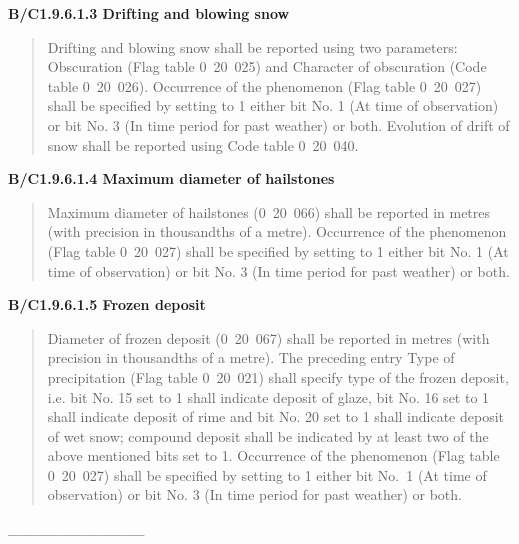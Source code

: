 \textbf{B/C1.9.6.1.3 Drifting and blowing snow}

\begin{quote}
Drifting and blowing snow shall be reported using two parameters: Obscuration (Flag table 0~20~025) and Character of obscuration (Code table 0~20~026). Occurrence of the phenomenon (Flag table 0~20~027) shall be specified by setting to 1 either bit No. 1 (At time of observation) or bit No. 3 (In time period for past weather) or both. Evolution of drift of snow shall be reported using Code table 0~20~040.
\end{quote}

\textbf{B/C1.9.6.1.4 Maximum diameter of hailstones}

\begin{quote}
Maximum diameter of hailstones (0~20~066) shall be reported in metres (with precision in thousandths of a metre). Occurrence of the phenomenon (Flag table 0~20~027) shall be specified by setting to 1 either bit No. 1 (At time of observation) or bit No. 3 (In time period for past weather) or both.
\end{quote}

\textbf{B/C1.9.6.1.5 Frozen deposit}

\begin{quote}
Diameter of frozen deposit (0~20~067) shall be reported in metres (with precision in thousandths of a metre). The preceding entry Type of precipitation (Flag table 0~20~021) shall specify type of the frozen deposit, i.e. bit No. 15 set to 1 shall indicate deposit of glaze, bit No. 16 set to 1 shall indicate deposit of rime and bit No. 20 set to 1 shall indicate deposit of wet snow; compound deposit shall be indicated by at least two of the above mentioned bits set to 1. Occurrence of the phenomenon (Flag table 0~20~027) shall be specified by setting to 1 either bit No.~1 (At time of observation) or bit No. 3 (In time period for past weather) or both.
\end{quote}

\_\_\_\_\_\_\_\_\_\_\_\_\_
